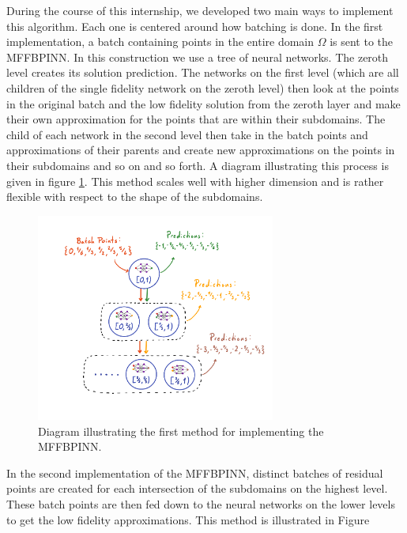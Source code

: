 \documentclass[12pt]{article}
\begin{document}
During the course of this internship, we developed two main ways to implement this algorithm. Each one is centered around how batching is done. In the first implementation, a batch containing points in the entire domain $\Omega$ is sent to the MFFBPINN. In this construction we use a tree of neural networks. The zeroth level creates its solution prediction. The networks on the first level (which are all children of the single fidelity network on the zeroth level) then look at the points in the original batch and the low fidelity solution from the zeroth layer and make their own approximation for the points that are within their subdomains. The child of each network in the second level then take in the batch points and approximations of their parents and create new approximations on the points in their subdomains and so on and so forth. A diagram illustrating this process is given in figure \ref{fig:batch1}. This method scales well with higher dimension and is rather flexible with respect to the shape of the subdomains.

\begin{figure}
\centering
\includegraphics[width=0.7\textwidth]{imgs/batch1}
\caption{Diagram illustrating the first method for implementing the MFFBPINN.}
\label{fig:batch1}
\end{figure}

In the second implementation of the MFFBPINN, distinct batches of residual points are created for each intersection of the subdomains on the highest level. These batch points are then fed down to the neural networks on the lower levels to get the low fidelity approximations. This method is illustrated in Figure



\end{document}
